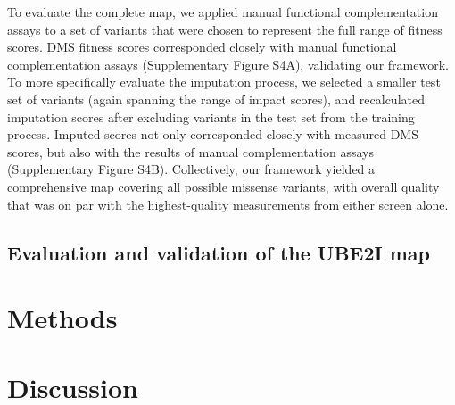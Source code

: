 To evaluate the complete map, we applied manual functional complementation assays to a set of variants that were chosen to represent the full range of fitness scores.  DMS fitness scores corresponded closely with manual functional complementation assays (Supplementary Figure S4A), validating our framework.  To more specifically evaluate the imputation process, we selected a smaller test set of variants (again spanning the range of impact scores), and recalculated imputation scores after excluding variants in the test set from the training process.  Imputed scores not only corresponded closely with measured DMS scores, but also with the results of manual complementation assays (Supplementary Figure S4B).  Collectively, our framework yielded a comprehensive map covering all possible missense variants, with overall quality that was on par with the highest-quality measurements from either screen alone.


\subsection{Evaluation and validation of the UBE2I map}

\section{Methods}

\section{Discussion}

